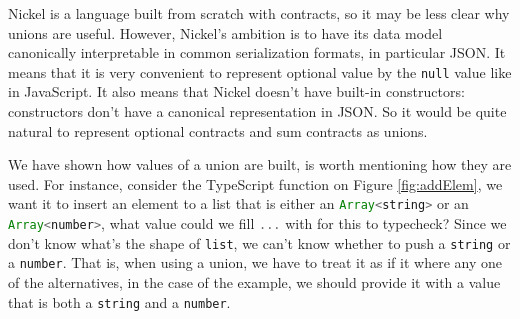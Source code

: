 \documentclass[sigplan,10pt,review,anonymous]{acmart}
\newcommand{\unsure}[2][1=]{}
\newcommand{\nickel}[1]{\lstinline[language=nickel]{#1}}
\newcommand{\typescript}[1]{\lstinline[language=JavaScript]{#1}}
\begin{document}
Nickel is a language built from scratch with contracts, so it may be
less clear why unions are useful. However, Nickel's ambition is to
have its data model canonically interpretable in common serialization
formats, in particular JSON. It means that it is very convenient to
represent optional value by the \nickel{null} value like in
JavaScript. It also means that Nickel doesn't have built-in
constructors: constructors don't have a canonical representation in
JSON. So it would be quite natural to represent optional contracts and
sum contracts as unions.

%




\unsure{Arnaud: this paragraph is pretty good, on the other hand, there
is no value which lets me complete the example, so this example falls
a bit flat.}
We have shown how values of a union are built, is worth mentioning
how they are used.
For instance, consider the TypeScript function on Figure \ref{fig:addElem},
we want it to insert an element to a list that is either an
\typescript{Array<string>} or an \typescript{Array<number>},
what value could we fill \typescript{...} with for this to typecheck?
Since we don't know what's the shape of \typescript{list},
we can't know whether to push a \typescript{string} or a
\typescript{number}.
That is, when using a union, we have to treat it as if it where any one
of the alternatives, in the case of the example, we should provide
it with a value that is both a \typescript{string} and a \typescript{number}.
\end{document}
